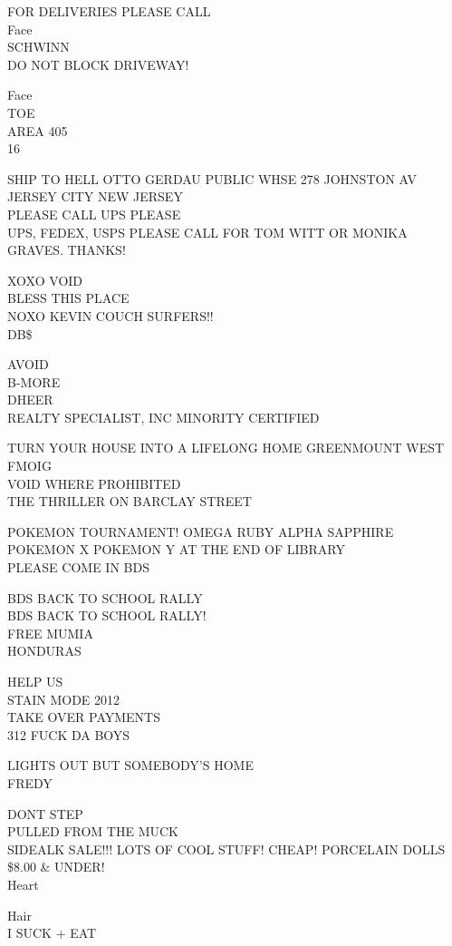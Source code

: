 \documentclass[10pt,letterpaper]{article}
\begin{document}
FOR DELIVERIES PLEASE CALL\\
Face\\
SCHWINN\\
DO NOT BLOCK DRIVEWAY!

Face\\
TOE\\
AREA 405\\
16

SHIP TO HELL OTTO GERDAU PUBLIC WHSE 278 JOHNSTON AV JERSEY CITY NEW JERSEY\\
PLEASE CALL UPS PLEASE\\
UPS, FEDEX, USPS PLEASE CALL FOR TOM WITT OR MONIKA GRAVES.  THANKS!

XOXO VOID\\
BLESS THIS PLACE\\
NOXO KEVIN COUCH SURFERS!!\\
DB\$

AVOID\\
B{-}MORE\\
DHEER\\
REALTY SPECIALIST, INC MINORITY CERTIFIED

TURN YOUR HOUSE INTO A LIFELONG HOME GREENMOUNT WEST\\
FMOIG\\
VOID WHERE PROHIBITED\\
THE THRILLER ON BARCLAY STREET

POKEMON TOURNAMENT!  OMEGA RUBY ALPHA SAPPHIRE POKEMON X POKEMON Y AT THE END OF LIBRARY\\
PLEASE COME IN BDS

BDS BACK TO SCHOOL RALLY\\
BDS BACK TO SCHOOL RALLY!\\
FREE MUMIA\\
HONDURAS

HELP US\\
STAIN MODE 2012\\
TAKE OVER PAYMENTS\\
312 FUCK DA BOYS

LIGHTS OUT BUT SOMEBODY'S HOME\\
FREDY

DONT STEP\\
PULLED FROM THE MUCK\\
SIDEALK SALE!!!  LOTS OF COOL STUFF!  CHEAP!  PORCELAIN DOLLS \$8.00 \& UNDER!\\
Heart

Hair\\
I SUCK + EAT
\end{document}
